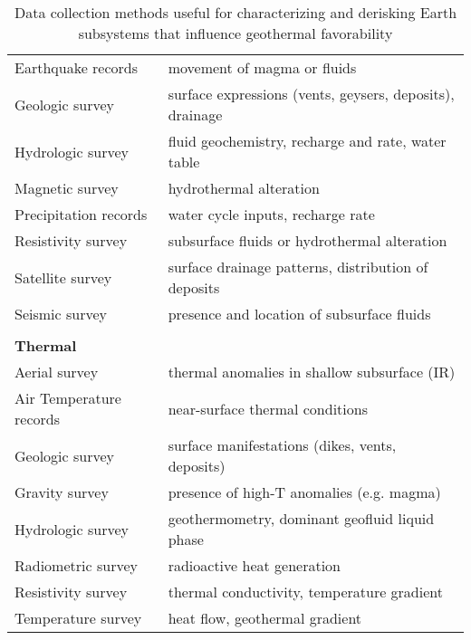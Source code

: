 \begin{table}[!htp]
\begin{tabular}{ll}
Earthquake records      & movement of magma or fluids                              \\
Geologic survey         & surface expressions (vents, geysers, deposits), drainage \\
Hydrologic survey       & fluid geochemistry, recharge and rate, water table       \\
Magnetic survey         & hydrothermal alteration                                  \\
Precipitation records   & water cycle inputs, recharge rate                        \\
Resistivity survey      & subsurface fluids or hydrothermal alteration             \\
Satellite survey        & surface drainage patterns, distribution of deposits      \\
Seismic survey          & presence and location of subsurface fluids               \\
                        &                                                          \\
\textbf{Thermal}        &                                                          \\ \hline
Aerial survey           & thermal anomalies in shallow subsurface (IR)             \\
Air Temperature records & near-surface thermal conditions                          \\
Geologic survey         & surface manifestations (dikes, vents, deposits)          \\
Gravity survey          & presence of high-T anomalies (e.g. magma)                \\
Hydrologic survey       & geothermometry, dominant geofluid liquid phase           \\
Radiometric survey      & radioactive heat generation                              \\
Resistivity survey      & thermal conductivity, temperature gradient               \\
Temperature survey      & heat flow, geothermal gradient                          
\end{tabular}
\caption[Data collection methods for geothermal derisking]{Data collection methods useful for characterizing and derisking Earth subsystems that influence geothermal favorability}
\label{tab:surveytypes}
\end{table}

